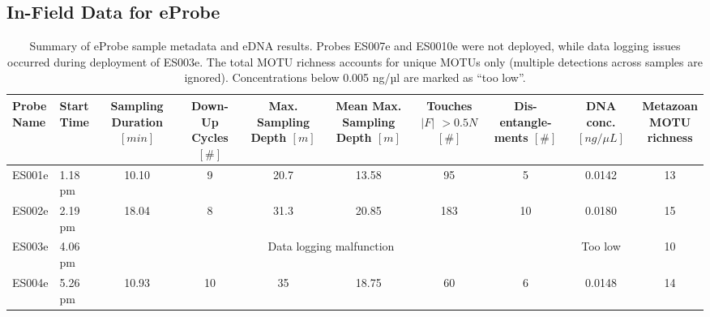 \subsection{In-Field Data for eProbe}
\label{sec:results-field-data}

\begin{table}[tb]
  \footnotesize
  \centering
  \caption{Summary of eProbe sample metadata and \gls{eDNA} results. Probes ES007e and ES0010e were not deployed, while data logging issues occurred during deployment of ES003e. The total \gls{MOTU} richness accounts for unique \glspl{MOTU} only (multiple detections across samples are ignored). Concentrations below 0.005 ng/µl are marked as “too low”.}
    \begin{tabular}{llcccccccc}
    \toprule
    \thead{Probe \\ Name} 
    & \thead{Start \\ Time}
    & \thead{Sampling \\ Duration \\$[min]$}
    & \thead{Down-\\Up\\Cycles\\$[\#]$}
    & \thead{Max.\\Sampling\\Depth\\$[m]$}
    & \thead{Mean\\Max.\\Sampling\\Depth $[m]$}
    & \thead{Touches\\$\vert F \vert$ \\$>0.5N$\\$[\#]$}
    & \thead{Dis-\\entangle-\\ments\\$[\#]$}
    & \thead{DNA\\conc.\\$[ng/\mu L]$}
    & \thead{Metazoan\\MOTU\\richness} \\
    \midrule
    ES001e & 1.18 pm & 10.10 & 9 & 20.7 & 13.58 & 95 & 5 & 0.0142 & 13 \\
    ES002e & 2.19 pm & 18.04 & 8 & 31.3 & 20.85 & 183 & 10 & 0.0180 & 15 \\
    ES003e & 4.06 pm & \multicolumn{6}{c}{Data logging malfunction} & Too low & 10 \\
    ES004e & 5.26 pm & 10.93 & 10 & 35 & 18.75 & 60 & 6 & 0.0148 & 14 \\

\end{tabular}
\end{table}
